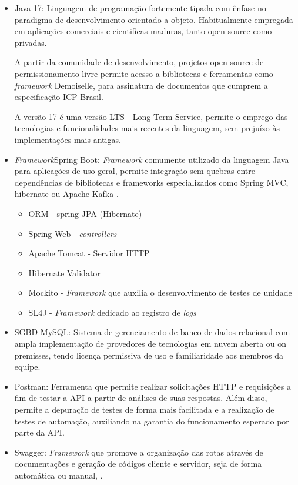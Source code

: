 \documentclass[
    12pt,               %
    openright,          %
    oneside,
    a4paper,            %
    BIBLATEX,           %
    TODO,               %
    english,            %
    brazil              %
    ]{ifsp-spo-inf-ctds}
\begin{document}
            \begin{itemize}
                \item Java 17: 
                    Linguagem de programação fortemente tipada com ênfase no paradigma de desenvolvimento orientado a objeto. Habitualmente empregada em aplicações comerciais e cientificas maduras, tanto open source como privadas.

                    A partir da comunidade de desenvolvimento, projetos open source de permissionamento livre permite acesso a bibliotecas e ferramentas como \emph{framework} Demoiselle, para assinatura de documentos que cumprem a especificação ICP-Brasil.

                    A versão 17 é uma versão LTS - Long Term Service, permite o emprego das tecnologias e funcionalidades mais recentes da linguagem, sem prejuízo às implementações mais antigas.

                \item \emph{Framework}Spring Boot: 
                   \emph{ Framework} comumente utilizado da linguagem Java para aplicações de uso geral, permite integração sem quebras entre dependências de bibliotecas e frameworks especializados como Spring MVC, hibernate ou Apache Kafka .
                    \begin{itemize}
                        \item ORM - spring JPA (Hibernate)
                        \item Spring Web - \emph{controllers}
                        \item Apache Tomcat - Servidor HTTP
                        \item Hibernate Validator
                        \item Mockito - \emph{Framework} que auxilia o desenvolvimento de testes de unidade
                        \item SL4J - \emph{Framework} dedicado ao registro de \emph{logs}
                    \end{itemize}
                \item SGBD MySQL:
                    Sistema de gerenciamento de banco de dados relacional com ampla implementação de provedores de tecnologias em nuvem aberta ou on premisses, tendo licença permissiva de uso e familiaridade aos membros da equipe.

                \item Postman:
                Ferramenta que permite realizar solicitações HTTP e requisições a fim de testar a API a partir de análises de suas respostas. Além disso, permite a depuração de testes de forma mais facilitada e a realização de testes de automação, auxiliando na garantia do funcionamento esperado por parte da API. 

                \item Swagger:
                \emph{Framework} que promove a organização das rotas através de documentações e geração de códigos cliente e servidor, seja de forma automática ou manual, .

            \end{itemize} 
\end{document}

